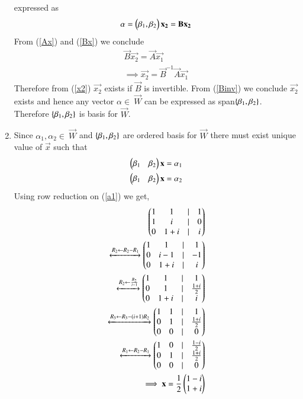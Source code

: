 \documentclass[journal,12pt,twocolumn]{IEEEtran}
\begin{document}
\begin{enumerate}[label=\emph{\alph*)}]
expressed as
\begin{align}
	\alpha=\myvec{\beta_1,\beta_2}\vec{x_2}=\vec{B}\vec{x_2} \label{Bx}
\end{align}
From (\ref{Ax}) and (\ref{Bx}) we conclude
\begin{align}
	\vec{B}\vec{x_2}=\vec{A}\vec{x_1}\\
	\implies \vec{x_2}=\vec{B}^{-1}\vec{A}\vec{x_1} \label{x2}
\end{align}
Therefore from (\ref{x2}) $\vec{x_2}$ exists if $\vec{B}$ is invertible. From
(\ref{Binv}) we conclude $\vec{x_2}$ exists and hence any vector $\alpha \in \ \vec{W}$
can be expressed as span$\left\{\beta_1,\beta_2\right\}$. Therefore $\left\{\beta_1,\beta_2\right\}$
is basis for $\vec{W}$.
\item
	Since $\alpha_1,\alpha_2 \in \ \vec{W}$ and $\left\{\beta_1,\beta_2\right\}$ are ordered
	basis for $\vec{W}$ there must exist unique value of $\vec{x}$ such that
	\begin{align}
		\myvec{\beta_1 & \beta_2}\vec{x}=\alpha_1 \label{a1}\\
		\myvec{\beta_1 & \beta_2}\vec{x}=\alpha_2 \label{a2}
	\end{align}
Using row reduction on (\ref{a1}) we get,
\begin{align}
	\myvec{1 & 1 & | & 1 \\
	       1 & i & | & 0 \\
	       0 & 1+i &| & i}\\
	\xleftrightarrow[]{R_2 \leftarrow R_2-R_1}
	\myvec{1 & 1 & | & 1 \\
               0 & i-1 & | & -1 \\
               0 & 1+i &| & i}\\
        \xleftrightarrow[]{R_2 \leftarrow \frac{R_2}{i-1}}
	\myvec{1 & 1 & | & 1 \\
	       0 & 1 & | & \frac{1+i}{2} \\
               0 & 1+i &| & i}\\
	\xleftrightarrow[]{R_3 \leftarrow R_3 - (i+1)R_2}
	\myvec{1 & 1 & | & 1 \\
               0 & 1 & | & \frac{1+i}{2} \\
               0 & 0 &| & 0}\\
	\xleftrightarrow[]{R_1 \leftarrow R_2- R_1}
	\myvec{1 & 0 & | & \frac{1-i}{2} \\
               0 & 1 & | & \frac{1+i}{2} \\
               0 & 0 &| & 0}\\
	\implies 
	\vec{x}=\frac{1}{2}\myvec{1-i \\ 1+i}

\end{align}
\end{enumerate}
\end{document}

